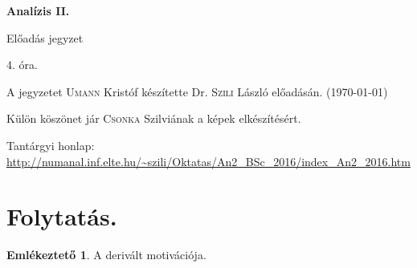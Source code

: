\documentclass[a4paper,11.5pt]{article}
\begin{document}
	\setlength\parindent{0pt}
	\def\s{\hspace{0.2mm}\vphantom{\beta}}
	\def\Z{\mathbb{Z}}
	\def\Q{\mathbb{Q}}
	\def\R{\mathbb{R}}
	\def\C{\mathbb{C}}
	\def\N{\mathbb{N}}
	\def\Ra{\overline{\mathbb{R}}}
	
	\def\sume{\displaystyle\sum_{n=1}^{+\infty}}
	\def\sumn{\displaystyle\sum_{n=0}^{+\infty}}
	
	\def\narrow{\underset{n\rightarrow+\infty}{\longrightarrow}}
	\def\limn{\displaystyle\lim_{n\to +\infty}}
	\def\limx{\displaystyle\lim_{x\to +\infty}}
	
	\theoremstyle{definition}
	\newtheorem{theorem}{Tétel}[subsection] 
	
	\theoremstyle{definition}
	\newtheorem{definition}[theorem]{Definíció} 
	\newtheorem{example}[theorem]{Példa} 
	\newtheorem{task}[theorem]{Feladat} 
	\newtheorem{note}[theorem]{Megjegyzés}
	\newtheorem{revision}[theorem]{Emlékeztető}
	\begin{center}
		{\LARGE\textbf{Analízis II.}}
		
		{\Large Előadás jegyzet}
		
		4. óra.
	\end{center}
	A jegyzetet \textsc{Umann} Kristóf készítette Dr. \textsc{Szili} László  előadásán. (\today)
	
	Külön köszönet jár \textsc{Csonka} Szilviának a képek elkészítésért.
	\bigskip
	
	Tantárgyi honlap: \url{http://numanal.inf.elte.hu/~szili/Oktatas/An2_BSc_2016/index_An2_2016.htm}
	
	
	\section{Folytatás.}
	\begin{revision}
		A derivált motivációja.
	\end{revision}
\end{document}
